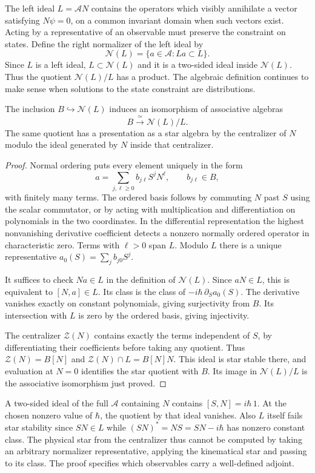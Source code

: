 \documentclass[11pt,letterpaper]{article}
\newcommand{\cA}{\mathcal A}
\newcommand{\cN}{\mathcal N}
\newcommand{\cZ}{\mathcal Z}
\begin{document}
The left ideal $L=\cA N$ contains the operators which visibly annihilate a vector satisfying
$N\psi=0$, on a common invariant domain when such vectors exist. Acting by a representative of
an observable must preserve the constraint on states. Define the right normalizer of the left
ideal by
\[
 \cN(L)=\{a\in\cA:L a\subset L\}.
\]
Since $L$ is a left ideal, $L\subset\cN(L)$ and it is a two-sided ideal inside $\cN(L)$. Thus
the quotient $\cN(L)/L$ has a product. The algebraic definition continues to make sense when
solutions to the state constraint are distributions.

\begin{theorem}\label{thm:weyl}
The inclusion $B\hookrightarrow\cN(L)$ induces an isomorphism of associative algebras
\[
 B\xrightarrow{\ \simeq\ }\cN(L)/L .
\]
The same quotient has a presentation as a star algebra by the centralizer of $N$ modulo the
ideal generated by $N$ inside that centralizer.
\end{theorem}
\begin{proof}
Normal ordering puts every element uniquely in the form
\[
 a=\sum_{j,\ell\geq0} b_{j\ell} S^j N^\ell,\qquad b_{j\ell}\in B ,
\]
with finitely many terms. The ordered basis follows by commuting $N$ past $S$ using the scalar
commutator, or by acting with multiplication and differentiation on polynomials in the two
coordinates. In the differential representation the highest nonvanishing derivative
coefficient detects a nonzero normally ordered operator in characteristic zero. Terms with
$\ell>0$ span $L$. Modulo $L$ there is a unique representative $a_0(S)=\sum_j b_{j0}S^j$.

It suffices to check $Na\in L$ in the definition of $\cN(L)$. Since $aN\in L$, this is
equivalent to $[N,a]\in L$. Its class is the class of $-i\hbar\,\partial_S a_0(S)$. The
derivative vanishes exactly on constant polynomials, giving surjectivity from $B$. Its
intersection with $L$ is zero by the ordered basis, giving injectivity.

The centralizer $\cZ(N)$ contains exactly the terms independent of $S$, by differentiating
their coefficients before taking any quotient. Thus $\cZ(N)=B[N]$ and $\cZ(N)\cap L=B[N]N$.
This ideal is star stable there, and evaluation at $N=0$ identifies the star quotient with
$B$. Its image in $\cN(L)/L$ is the associative isomorphism just proved.
\end{proof}

A two-sided ideal of the full $\cA$ containing $N$ contains $[S,N]=i\hbar\,1$. At the chosen
nonzero value of $\hbar$, the quotient by that ideal vanishes. Also $L$ itself fails star
stability since $SN\in L$ while $(SN)^*=NS=SN-i\hbar$ has nonzero constant class. The physical
star from the centralizer thus cannot be computed by taking an arbitrary normalizer
representative, applying the kinematical star and passing to its class. The proof specifies
which observables carry a well-defined adjoint.
\end{document}
